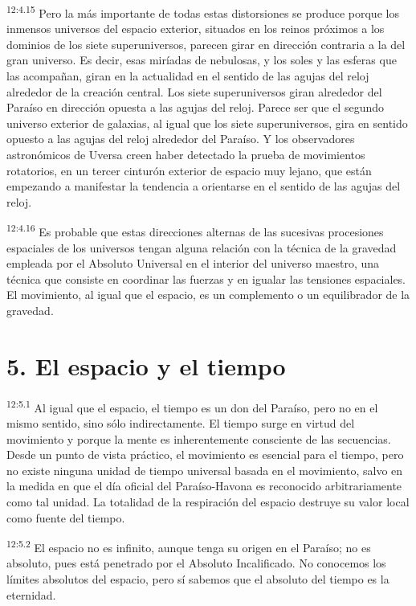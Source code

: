 \par
\textsuperscript{12:4.15} Pero la más importante de todas estas distorsiones se produce porque los inmensos universos del espacio exterior, situados en los reinos próximos a los dominios de los siete superuniversos, parecen girar en dirección contraria a la del gran universo. Es decir, esas miríadas de nebulosas, y los soles y las esferas que las acompañan, giran en la actualidad en el sentido de las agujas del reloj alrededor de la creación central. Los siete superuniversos giran alrededor del Paraíso en dirección opuesta a las agujas del reloj. Parece ser que el segundo universo exterior de galaxias, al igual que los siete superuniversos, gira en sentido opuesto a las agujas del reloj alrededor del Paraíso. Y los observadores astronómicos de Uversa creen haber detectado la prueba de movimientos rotatorios, en un tercer cinturón exterior de espacio muy lejano, que están empezando a manifestar la tendencia a orientarse en el sentido de las agujas del reloj.

\par
\textsuperscript{12:4.16} Es probable que estas direcciones alternas de las sucesivas procesiones espaciales de los universos tengan alguna relación con la técnica de la gravedad empleada por el Absoluto Universal en el interior del universo maestro, una técnica que consiste en coordinar las fuerzas y en igualar las tensiones espaciales. El movimiento, al igual que el espacio, es un complemento o un equilibrador de la gravedad.

\section*{5. El espacio y el tiempo}
\par
\textsuperscript{12:5.1} Al igual que el espacio, el tiempo es un don del Paraíso, pero no en el mismo sentido, sino sólo indirectamente. El tiempo surge en virtud del movimiento y porque la mente es inherentemente consciente de las secuencias. Desde un punto de vista práctico, el movimiento es esencial para el tiempo, pero no existe ninguna unidad de tiempo universal basada en el movimiento, salvo en la medida en que el día oficial del Paraíso-Havona es reconocido arbitrariamente como tal unidad. La totalidad de la respiración del espacio destruye su valor local como fuente del tiempo.

\par
\textsuperscript{12:5.2} El espacio no es infinito, aunque tenga su origen en el Paraíso; no es absoluto, pues está penetrado por el Absoluto Incalificado. No conocemos los límites absolutos del espacio, pero sí sabemos que el absoluto del tiempo es la eternidad.


